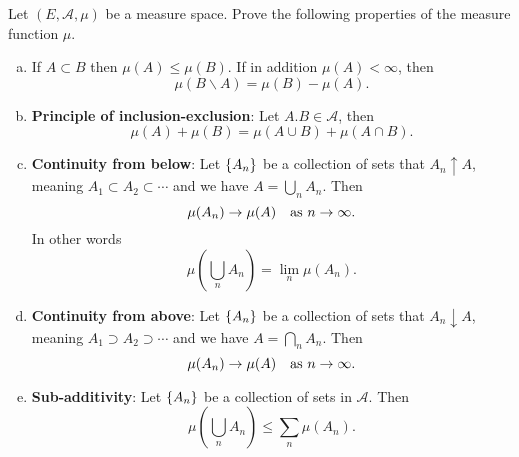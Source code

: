 \begin{problem}
	Let $ (E, \mathcal{A}, \mu) $ be a measure space. Prove the following properties of the measure function $ \mu $.
	\begin{enumerate}[(a)]
		\item If $ A\subset B $ then $ \mu(A) \leq \mu(B) $. If in addition $ \mu(A) < \infty $, then
		\[ \mu(B\backslash A) = \mu(B) - \mu(A). \]
		\item \textbf{Principle of inclusion-exclusion}: Let $ A.B \in \mathcal{A} $, then
		\[ \mu(A) + \mu(B) = \mu(A\cup B) + \mu (A\cap B). \]
		\item \textbf{Continuity from below}: Let $ \{A_n\} $ be a collection of sets that $ A_n \uparrow A $, meaning $ A_1\subset A_2 \subset\cdots $ and we have $ A = \bigcup_n A_n $. Then
		\[ \mu(A_n) \to \mu(A) \quad \text{as $ n\to\infty $}. \]
		In other words
		\[ \mu(\bigcup_n A_n) = \lim_n \mu(A_n). \]
		\item \textbf{Continuity from above}: Let $ \{A_n\} $ be a collection of sets that $ A_n \downarrow A $, meaning $ A_1 \supset A_2 \supset \cdots $ and we have $ A = \bigcap_n A_n $. Then
		\[ \mu(A_n) \to \mu(A) \quad \text{as $ n\to\infty $}. \]
		\item \textbf{Sub-additivity}: Let $ \{A_n\} $ be a collection of sets in $ \mathcal{A} $. Then
		\[ \mu(\bigcup_n A_n) \leq \sum_n \mu(A_n). \]
	\end{enumerate}
\end{problem}
